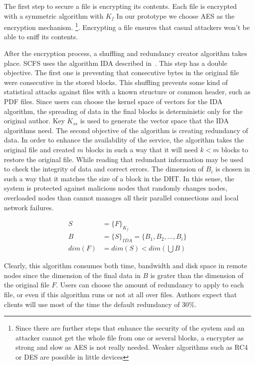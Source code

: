 \documentclass{llncs}
\begin{document}
The first step to secure a file is encrypting its contents. Each file is encrypted
with a symmetric algorithm with $K_f$ In our prototype we choose AES as the encryption mechanism.
\footnote{Since there are further steps that enhance the security of the system and an attacker cannot get the whole file from one or several blocks, a encrypter as strong and slow as AES is not really needed. Weaker algorithms such as RC4 or DES are possible in little devices}. Encrypting a file ensures that casual attackers won't be able
to sniff its contents.

After the encryption process, a shuffling and redundancy creator algorithm takes place. SCFS uses the algorithm IDA described in~\cite{IDA}. This step has a double objective. The first one is preventing that consecutive bytes in the original file were consecutive in the stored blocks. This shuffling prevents some kind of statistical attacks against files with a known structure or common header, such as PDF files. Since users can choose the kernel space of vectors for the IDA algorithm, the spreading of data in the final blocks is deterministic only for the original author. Key $K_{ss}$ is used to generate the vector space that the IDA algorithms need. The second objective of the algorithm is creating redundancy of data. In order to enhance the availability of the service, the algorithm takes the original file and created $m$ blocks in such a way that it will need $k<m$ blocks to restore the original file. While reading that redundant information may be used to check the integrity of data and correct errors. The dimension of $B_i$ is chosen in such a way that it matches the size of a block in the DHT. In this sense, the system is protected against malicious nodes that randomly changes nodes, overloaded nodes than cannot manages all their parallel connections and local network failures.

\begin{align}
S & = \lbrace F \rbrace_{K_f} \\
B & = \lbrace S \rbrace_{IDA} = \lbrace B_1, B_2, ..., B_i \rbrace \\
dim(F) & = dim(S) < dim(\bigcup B)
 \end{align}

Clearly, this algorithm consumes both time, bandwidth and disk space in remote nodes since the dimension of the final data in $B$ is grater than the dimension of the original file $F$. Users can choose the amount of redundancy to apply to each file, or even if this algorithm runs or not at all over files. Authors expect that clients will use most of the time the default redundancy of 30\%.
\end{document}
